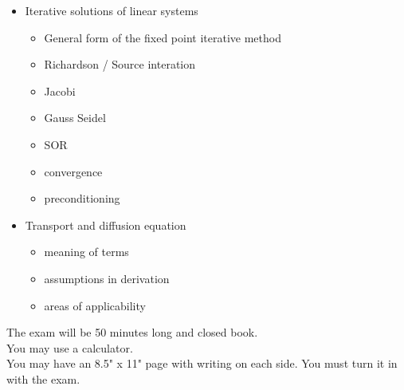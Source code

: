 \documentclass[12pt]{article}
\begin{document}
\begin{itemize}
\item Iterative solutions of linear systems
  \begin{itemize}
  \item General form of the fixed point iterative method
  \item Richardson / Source interation
  \item Jacobi
  \item Gauss Seidel
  \item SOR
  \item convergence
  \item preconditioning
  \end{itemize}
  
\item Transport and diffusion equation
  \begin{itemize}
  \item meaning of terms
  \item assumptions in derivation
  \item areas of applicability
  \end{itemize}
\end{itemize}

The exam will be 50 minutes long and closed book. \\
You may use a calculator.\\
You may have an 8.5" x 11" page with writing on each side. You must turn it in with the exam.
\end{document}
